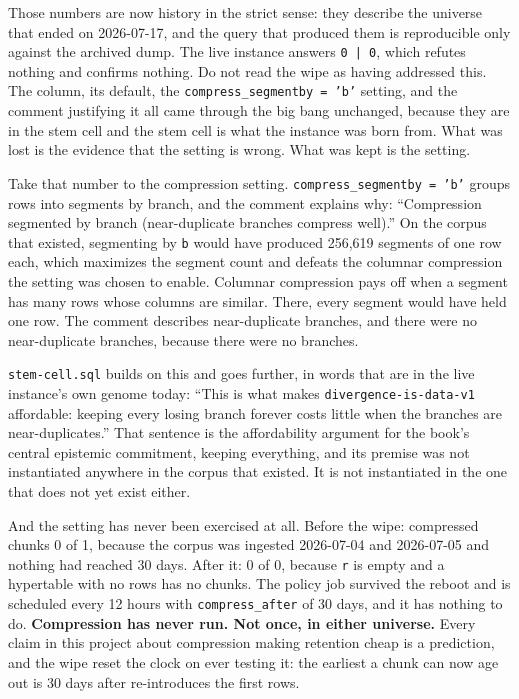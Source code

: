 Those numbers are now history in the strict sense: they describe the universe that ended on 2026-07-17, and the query that produced them is reproducible only against the archived dump. The live instance answers \texttt{0 | 0}, which refutes nothing and confirms nothing. Do not read the wipe as having addressed this. The column, its default, the \texttt{compress\_segmentby = 'b'} setting, and the comment justifying it all came through the big bang unchanged, because they are in the stem cell and the stem cell is what the instance was born from. What was lost is the evidence that the setting is wrong. What was kept is the setting.

Take that number to the compression setting. \texttt{compress\_segmentby = 'b'} groups rows into segments by branch, and the comment explains why: ``Compression segmented by branch (near-duplicate branches compress well).'' On the corpus that existed, segmenting by \texttt{b} would have produced 256,619 segments of one row each, which maximizes the segment count and defeats the columnar compression the setting was chosen to enable. Columnar compression pays off when a segment has many rows whose columns are similar. There, every segment would have held one row. The comment describes near-duplicate branches, and there were no near-duplicate branches, because there were no branches.

\texttt{stem-cell.sql} builds on this and goes further, in words that are in the live instance's own genome today: ``This is what makes \texttt{divergence-is-data-v1} affordable: keeping every losing branch forever costs little when the branches are near-duplicates.'' That sentence is the affordability argument for the book's central epistemic commitment, keeping everything, and its premise was not instantiated anywhere in the corpus that existed. It is not instantiated in the one that does not yet exist either.

And the setting has never been exercised at all. Before the wipe: compressed chunks 0 of 1, because the corpus was ingested 2026-07-04 and 2026-07-05 and nothing had reached 30 days. After it: 0 of 0, because \texttt{r} is empty and a hypertable with no rows has no chunks. The policy job survived the reboot and is scheduled every 12 hours with \texttt{compress\_after} of 30 days, and it has nothing to do. \textbf{Compression has never run. Not once, in either universe.} Every claim in this project about compression making retention cheap is a prediction, and the wipe reset the clock on ever testing it: the earliest a chunk can now age out is 30 days after \labPI re-introduces the first rows.

